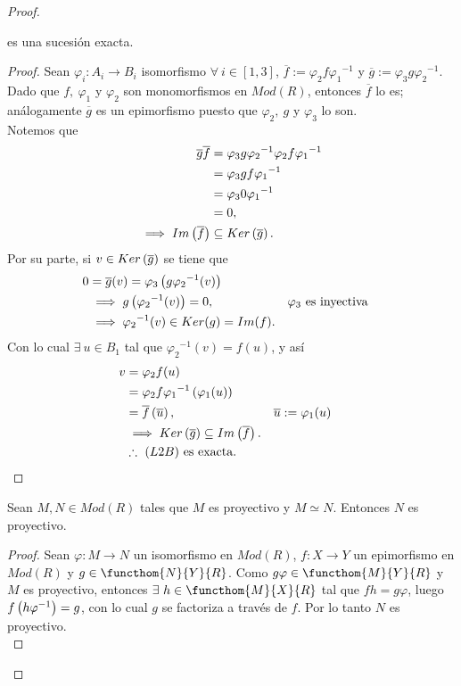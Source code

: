 \documentclass{article}
\begin{document}
\begin{enumerate}[label=\textbf{Ej \arabic*.}]
\begin{proof}
\begin{lem}
				es una sucesión exacta.
			\end{lem}
			\begin{proof}
				Sean $\varphi_i:A_i\to B_i$ isomorfismo $\forall\ i\in[1,3]$, $\overline{f}:=\varphi_2f{\varphi_1}^{-1}$ y $\overline{g}:=\varphi_3
				g{\varphi_2}^{-1}$. Dado que $f,\ \varphi_1$ y $\varphi_2$ son monomorfismos en $Mod(R)$, entonces $\overline{f}$ lo es; análogamente $\overline{g}$ es un epimorfismo puesto que $\varphi_2,\ g$ y $\varphi_3$ lo son. \\
				Notemos que
				\begin{align*}
					\overline{g}\overline{f}&=\varphi_3
					g{\varphi_2}^{-1}\varphi_2 f{\varphi_1}^{-1}\\
					&=\varphi_3
					gf{\varphi_1}^{-1}\\
					&=\varphi_3 0 {\varphi_1}^{-1}\\
					&=0,\\
					\implies Im\left(\overline{f}\right)&\subseteq Ker\left(\overline{g}\right).
				\end{align*}
				Por su parte, si $v\in Ker\left(\overline{g}\right)$ se tiene que
				\begin{align*}
					0&=\overline{g}(v)=\varphi_3
					\left(g{\varphi_2}^{-1}(v)\right)\\
					&\implies g\left({\varphi_2}^{-1}(v)\right)=0, && \varphi_3\text{ es inyectiva}\\
					&\implies{\varphi_2}^{-1}(v)\in Ker(g)=Im(f).
				\end{align*}
				Con lo cual $\exists\ u\in B_1$ tal que ${\varphi_2}^{-1}(v)=f(u)$, y así \begin{align*}
					v&=\varphi_2 f(u)\\
					&=\varphi_2 f{\varphi_1}^{-1}\left(\varphi_1(u)\right)\\
					&=\overline{f}\left(\overline{u}\right), && \overline{u}:=\varphi_1(u)\\
					&\implies Ker\left(\overline{g}\right)\subseteq Im\left(\overline{f}\right).\\
					&\therefore\ (L2B)\text{ es exacta.}
				\end{align*}
			\end{proof}
			\begin{lem}
				Sean $M,N\in Mod(R)$ tales que $M$ es proyectivo y $M\simeq N$. Entonces $N$ es proyectivo.
			\end{lem}
			\begin{proof}
				Sean $\varphi:M\to N$ un isomorfismo en $Mod(R)$, $f:X\to Y$ un epimorfismo en $Mod(R)$ y $g\in\functhom{N}{Y}{R}$. Como $g\varphi \in\functhom{M}{Y}{R}$ y $M$ es proyectivo, entonces $\exists\ h\in\functhom{M}{X}{R}$ tal que $fh=g\varphi$, luego $f\left(h\varphi^{-1}\right)=g$, con lo cual $g$ se factoriza a través de $f$. Por lo tanto $N$ es proyectivo.\\

\end{proof}
\end{proof}
\end{enumerate}
\end{document}
